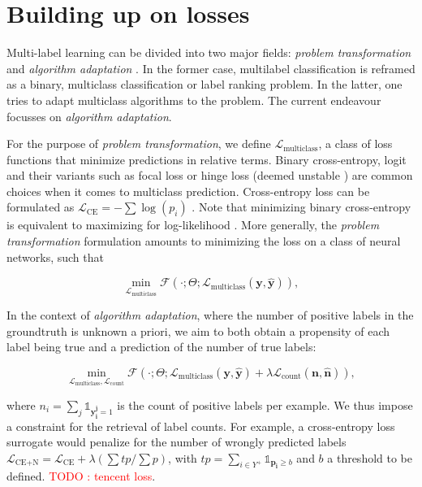 \documentclass[sigconf,natbib,screen=true,review=true,anonymous]{acmart}
\newcommand\todo[1]{\textcolor{red}{TODO : #1}}
\begin{document}
\section{Building up on losses}
\label{sec:orgd0f140d}

Multi-label learning can be divided into two major fields: \emph{problem transformation} and \emph{algorithm adaptation} \cite{multilabelReview}. In the former case, multilabel classification is reframed as a binary, multiclass classification or label ranking problem. In the latter, one tries to adapt multiclass algorithms to the problem. The current endeavour focusses on \emph{algorithm adaptation}.


For the purpose of \emph{problem transformation}, we define \(\mathcal{L}_{\text {multiclass}}\), a class of loss functions that minimize predictions in relative terms. Binary cross-entropy, logit and their variants such as focal loss or hinge loss (deemed unstable \cite{focalLoss}) are common choices when it comes to multiclass prediction. Cross-entropy loss can be formulated as \(\mathcal{L}_{\text {CE}}=-\sum \log \left(p_{i}\right)\) . Note that minimizing binary cross-entropy is equivalent to maximizing for log-likelihood \cite[Section 4.3.4]{Bishop}. More generally, the \emph{problem transformation} formulation amounts to minimizing the loss on a class of neural networks, such that

\begin{equation}
\underset{\mathcal{L}_{\text {multiclass}}} {\min} \mathcal{F}\left(\cdot ; \Theta; \mathcal{L}_{\text {multiclass}} (\mathbf{y}, \hat{\mathbf{y}}) \right),
\end{equation}

In the context of \emph{algorithm adaptation}, where the number of positive labels in the groundtruth is unknown a priori, we aim to both obtain a propensity of each label being true and a prediction of the number of true labels: 

\begin{equation}
\underset{\mathcal{L}_{\text {multiclass}}, \mathcal{L}_{\text {count}}} {\min} \mathcal{F}\left(\cdot ; \Theta; \mathcal{L}_{\text {multiclass}} (\mathbf{y}, \hat{\mathbf{y}}) + \lambda \mathcal{L}_{\text {count}} (\mathbf{n}, \hat{\mathbf{n}})\right),
\end{equation}

where \(n_i = \sum_j \mathds{1}_{\mathbf{y_i^j} = 1}\) is the count of positive labels per example. We thus impose a constraint for the retrieval of label counts. For example, a cross-entropy loss surrogate would penalize for the number of wrongly predicted labels \(\mathcal{L}_{\text {CE+N}}= \mathcal{L}_{\text {CE}} + \lambda (\sum tp / \sum p)\), with \(t p=\sum_{i \in Y^{+}} \mathds{1}_{\mathbf{p_i} \geq b}\) and \(b\) a threshold to be defined. \todo{tencent loss}.
\end{document}

